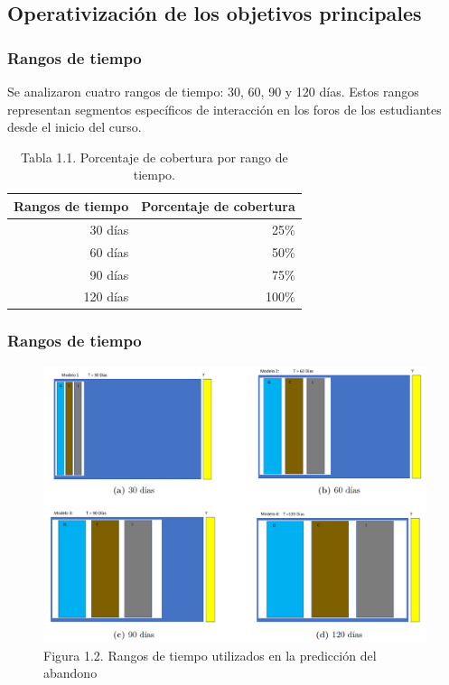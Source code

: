 \documentclass{beamer}
\begin{document}
\subsection{Operativización de los objetivos principales}
\begin{frame}
	\frametitle{Rangos de tiempo}
	Se analizaron cuatro rangos de tiempo: 30, 60, 90 y 120 días. Estos rangos representan segmentos específicos de interacción en los foros de los estudiantes desde el inicio del curso. 
	\begin{table}[H]
		\centering
		\begin{tabular}{rr}
			\toprule
			Rangos de tiempo & Porcentaje de cobertura \\
			\midrule
			30 días & 25\% \\
			60 días & 50\% \\
			90 días & 75\% \\
			120 días & 100\% \\
			\bottomrule
		\end{tabular}
		\caption{Tabla 1.1. Porcentaje de cobertura por rango de tiempo.}
	\end{table}
\end{frame}

\begin{frame}
	\frametitle{Rangos de tiempo}
	\begin{figure}
		\centering
		\includegraphics[width=0.7\linewidth]{figs/fig1}
		\caption{Figura 1.2. Rangos de tiempo utilizados en la predicción del abandono}
		\label{fig:fig1}
	\end{figure}
\end{frame}
\end{document}
